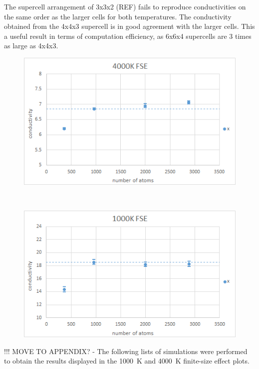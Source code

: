 The supercell arrangement of 3x3x2 (REF) fails to reproduce conductivities on the same order as the larger cells for both temperatures. 
The conductivity obtained from the 4x4x3 supercell is in good agreement with the larger cells. This a useful result in terms of computation efficiency, as 6x6x4 supercells are 3 times as large as 4x4x3.

\begin{figure}[h!]
\includegraphics[width=\linewidth]{Figures/gk_fse_4K_draft.png}
\caption[gk fse 4k]{}
\label{fig:gk_fse_4K}
\end{figure}
~
\begin{figure}[h!]
\includegraphics[width=\linewidth]{Figures/gk_fse_1K_draft.png}
\caption[gk fse 1k]{}
\label{fig:gk_fse_1K}
\end{figure}


%
\pagebreak
%


!!! MOVE TO APPENDIX? - The following lists of simulations were performed to obtain the results displayed in the 1000~K and 4000~K finite-size effect plots.

